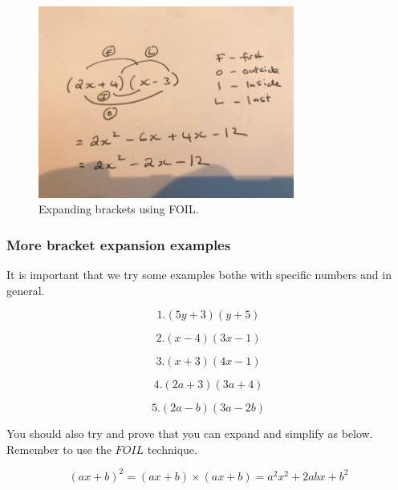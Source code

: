 \begin{figure}[h]
    \centering
    \includegraphics[width=0.75\textwidth]{IMG_4365}
    \caption{Expanding brackets using FOIL.}
    \label{fig:foil}
\end{figure}

\subsubsection{More bracket expansion examples}

It is important that we try some examples bothe with specific numbers and in general. 

\begin{equation} 
 1. \left ( 5y + 3 \right ) \left ( y + 5 \right )
\end{equation}

\begin{equation} 
 2. \left ( x - 4 \right ) \left ( 3x -1 \right )
\end{equation}

\begin{equation} 
 3. \left ( x + 3 \right ) \left ( 4x -1 \right )
\end{equation}

\begin{equation} 
 4. \left ( 2a + 3 \right ) \left ( 3a + 4 \right )
\end{equation}

\begin{equation} 
 5. \left ( 2a - b \right ) \left ( 3a - 2b \right )
\end{equation}

You should also try and prove that you can expand and simplify as below. Remember to use the $ FOIL $ technique.

\begin{equation} 
 \left ( ax + b \right )^{2} = \left ( ax + b \right ) \times \left ( ax + b \right ) = a^{2}x^{2} + 2abx + b^{2}
\end{equation}

